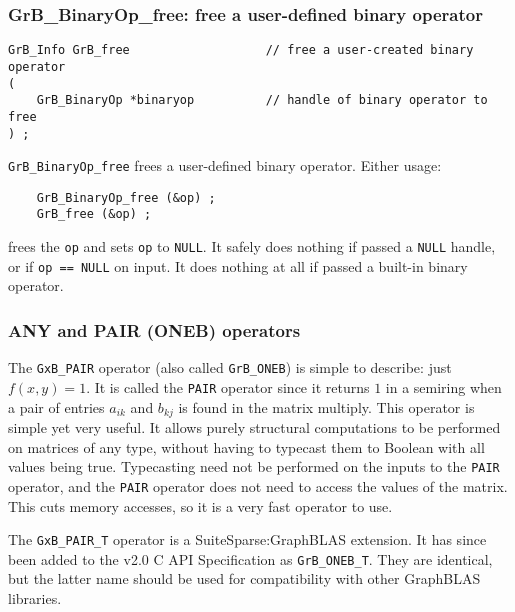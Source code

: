 \documentclass[12pt]{article}
\begin{document}
\subsubsection{{\sf GrB\_BinaryOp\_free:} free a user-defined binary operator}
\label{binaryop_free}

\begin{mdframed}[userdefinedwidth=6in]
{\footnotesize
\begin{verbatim}
GrB_Info GrB_free                   // free a user-created binary operator
(
    GrB_BinaryOp *binaryop          // handle of binary operator to free
) ;
\end{verbatim}
} \end{mdframed}

\verb'GrB_BinaryOp_free' frees a user-defined binary operator.
Either usage:

    {\small
    \begin{verbatim}
    GrB_BinaryOp_free (&op) ;
    GrB_free (&op) ; \end{verbatim}}

\noindent
frees the \verb'op' and sets \verb'op' to \verb'NULL'.
It safely does nothing if passed a \verb'NULL'
handle, or if \verb'op == NULL' on input.
It does nothing at all if passed a built-in binary operator.

\subsubsection{{\sf ANY} and {\sf PAIR} ({\sf ONEB}) operators}
\label{any_pair}

The \verb'GxB_PAIR' operator (also called \verb'GrB_ONEB') is simple to describe:
just $f(x,y)=1$.  It is called
the \verb'PAIR' operator since it returns $1$ in a semiring when a pair of
entries $a_{ik}$ and $b_{kj}$ is found in the matrix multiply.  This operator
is simple yet very useful.  It allows purely structural computations to be
performed on matrices of any type, without having to typecast them to Boolean
with all values being true.  Typecasting need not be performed on the inputs to
the \verb'PAIR' operator, and the \verb'PAIR' operator does not need to access
the values of the matrix.  This cuts memory accesses, so it is a very fast
operator to use.

The \verb'GxB_PAIR_T' operator is a SuiteSparse:GraphBLAS extension.
It has since been added to the v2.0 C API Specification as \verb'GrB_ONEB_T'.
They are identical, but the latter name should be used for compatibility
with other GraphBLAS libraries.
\end{document}
